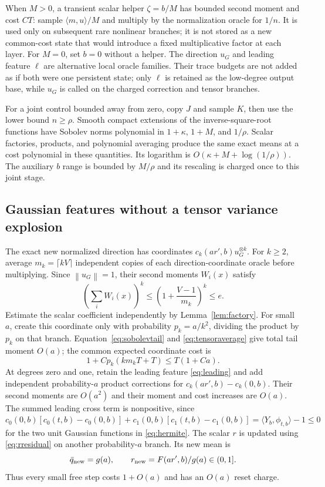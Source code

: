 \documentclass[11pt]{article}
\theoremstyle{remark}\newtheorem{remark}[theorem]{Remark}
\newcommand{\norm}[1]{\left\lVert #1\right\rVert}
\begin{document}
When $M>0$, a transient scalar helper $\zeta=b/M$ has bounded second
moment and cost $CT$: sample $\langle m,u\rangle/M$ and multiply by the
normalization oracle for $1/n$. It is used only on subsequent rare
nonlinear branches; it is not stored as a new common-cost state that would
introduce a fixed multiplicative factor at each layer. For $M=0$, set
$b=0$ without a helper.
The direction $u_G$ and leading feature $\ell$ are alternative local oracle
families. Their trace budgets are not added as if both were one persistent
state; only $\ell$ is retained as the low-degree output base, while
$u_G$ is called on the charged correction and tensor branches.

For a joint control bounded away from zero, copy $J$ and sample $K$,
then use the lower bound $n\ge\rho$. Smooth compact extensions of the
inverse-square-root functions have Sobolev norms polynomial in
$1+\kappa$, $1+M$, and $1/\rho$. Scalar factories, products, and polynomial
averaging produce the same exact means at a cost polynomial in these
quantities. Its logarithm is $O(\kappa+M+\log(1/\rho))$. The auxiliary
$b$ range is bounded by $M/\rho$ and its rescaling is charged once to
this joint stage.

\subsection{Gaussian features without a tensor variance explosion}

The exact new normalized direction has coordinates
$c_k(a r',b)u_G^{\otimes k}$. For $k\ge2$, average
$m_k=\lceil kV\rceil$ independent copies of each direction-coordinate
oracle before multiplying. Since $\norm{u_G}=1$, their second moments
$W_i(x)$ satisfy
\begin{equation}\label{eq:tensoraverage}
 \left(\sum_iW_i(x)\right)^k
 \le\left(1+\frac{V-1}{m_k}\right)^k\le e.
\end{equation}
Estimate the scalar coefficient independently by
Lemma~\ref{lem:factory}. For small $a$, create this coordinate only with
probability $p_k=a/k^2$, dividing the product by $p_k$ on that branch.
Equation~\eqref{eq:sobolevtail} and \eqref{eq:tensoraverage} give total
tail moment $O(a)$; the common expected coordinate cost is
\[
 1+Cp_k(km_kT+T)\le T(1+Ca).
\]
At degrees zero and one, retain the leading feature \eqref{eq:leading}
and add independent probability-$a$ product corrections for
$c_k(ar',b)-c_k(0,b)$. Their second moments are $O(a^2)$ and their
moment and cost increases are $O(a)$.
The summed leading cross term is nonpositive, since
$c_0(0,b)[c_0(t,b)-c_0(0,b)]+c_1(0,b)[c_1(t,b)-c_1(0,b)]
=\langle Y_b,\phi_{t,b}\rangle-1\le0$ for the two unit Gaussian
functions in \eqref{eq:hermite}.
The scalar $r$ is updated using
\eqref{eq:rresidual} on another probability-$a$ branch. Its new mean is
\begin{equation}\label{eq:qupdate}
 \bar q_{\rm new}=g(a),\qquad
 r_{\rm new}=F(ar',b)/g(a)\in(0,1].
\end{equation}
Thus every small free step costs $1+O(a)$ and has an $O(a)$ reset charge.
\end{document}
